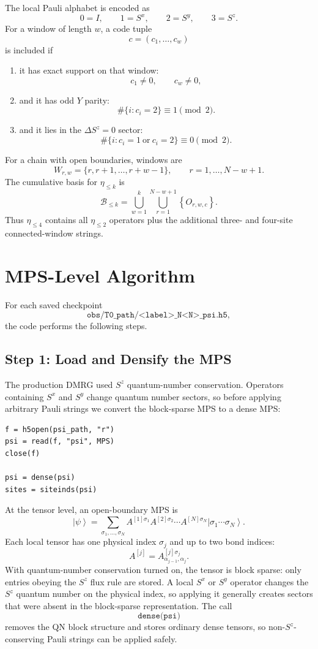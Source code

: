\documentclass[11pt]{article}
\newcommand{\ket}[1]{\left|#1\right\rangle}
\begin{document}
The local Pauli alphabet is encoded as
\[
  0=I,\qquad 1=S^x,\qquad 2=S^y,\qquad 3=S^z.
\]
For a window of length $w$, a code tuple
\[
  c=(c_1,\ldots,c_w)
\]
is included if
\begin{enumerate}
  \item it has exact support on that window:
  \[
    c_1\ne0,\qquad c_w\ne0,
  \]
  \item and it has odd $Y$ parity:
  \[
    \#\{i:c_i=2\}\equiv1\pmod 2.
  \]
  \item and it lies in the $\Delta S^z=0$ sector:
  \[
    \#\{i:c_i=1\ \text{or}\ c_i=2\}\equiv0\pmod 2.
  \]
\end{enumerate}
For a chain with open boundaries, windows are
\[
  W_{r,w}=\{r,r+1,\ldots,r+w-1\},
  \qquad
  r=1,\ldots,N-w+1.
\]
The cumulative basis for $\eta_{\le k}$ is
\[
  \mathcal B_{\le k}
  =
  \bigcup_{w=1}^{k}
  \bigcup_{r=1}^{N-w+1}
  \left\{
    O_{r,w,c}
  \right\}.
\]
Thus $\eta_{\le4}$ contains all $\eta_{\le2}$ operators plus the
additional three- and four-site connected-window strings.

\section{MPS-Level Algorithm}

For each saved checkpoint
\[
  \texttt{obs/T0\_path/<label>\_N<N>\_psi.h5},
\]
the code performs the following steps.

\subsection{Step 1: Load and Densify the MPS}

The production DMRG used $S^z$ quantum-number conservation.  Operators
containing $S^x$ and $S^y$ change quantum number sectors, so before
applying arbitrary Pauli strings we convert the block-sparse MPS to a
dense MPS:
\begin{lstlisting}
f = h5open(psi_path, "r")
psi = read(f, "psi", MPS)
close(f)

psi = dense(psi)
sites = siteinds(psi)
\end{lstlisting}

At the tensor level, an open-boundary MPS is
\begin{equation}
  \ket{\psi}
  =
  \sum_{\sigma_1,\ldots,\sigma_N}
  A^{[1]\sigma_1}
  A^{[2]\sigma_2}
  \cdots
  A^{[N]\sigma_N}
  \ket{\sigma_1\cdots\sigma_N}.
\end{equation}
Each local tensor has one physical index $\sigma_j$ and up to two bond
indices:
\begin{equation}
  A^{[j]}
  =
  A^{[j]\sigma_j}_{\alpha_{j-1},\alpha_j}.
\end{equation}
With quantum-number conservation turned on, the tensor is block sparse:
only entries obeying the $S^z$ flux rule are stored.  A local $S^x$ or
$S^y$ operator changes the $S^z$ quantum number on the physical index,
so applying it generally creates sectors that were absent in the
block-sparse representation.  The call
\[
  \texttt{dense(psi)}
\]
removes the QN block structure and stores ordinary dense tensors, so
non-$S^z$-conserving Pauli strings can be applied safely.
\end{document}
